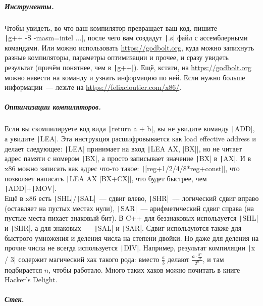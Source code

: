 \documentclass{article}
\begin{document}
    \subparagraph{Инструменты.}
    Чтобы увидеть, во что ваш компилятор превращает ваш код, пишите\\
    \texttt|g++ -S -masm=intel ...|, после чего вам создадут \texttt|.s| файл с ассемблерными командами. Или можно использовать \url{https://godbolt.org}, куда можно запихнуть разные компиляторы, параметры оптимизации и прочее, и сразу увидеть результат (причём понятнее, чем в \texttt|g++|). Ещё, кстати, на \url{https://godbolt.org} можно навести на команду и узнать информацию по ней. Если нужно больше информации~--- лезьте на \url{https://felixcloutier.com/x86/}.
    \subparagraph{Оптимизации компиляторов.}
    Если вы скомпилируете код вида \texttt|return a + b|, вы не увидите команду \texttt|ADD|, а увидите \texttt|LEA|. Эта инструкция расшифровывается как load effective address и делает следующее: \texttt|LEA| принимает на вход \texttt|LEA AX, [BX]|, но не читает адрес памяти с номером \texttt|BX|, а просто записывает значение \texttt|BX| в \texttt|AX|. И в x86 можно записать как адрес что-то такое: \texttt|[reg+1/2/4/8*reg+const]|, что позволяет написать \texttt|LEA AX [BX+CX]|, что будет быстрее, чем \texttt|ADD|+\texttt|MOV|.\\
    Ещё в x86 есть \texttt|SHL|/\texttt|SAL|~--- сдвиг влево, \texttt|SHR|~--- логический сдвиг вправо (оставляет на пустых местах нули), \texttt|SAR|~--- арифметический сдвиг справа (на пустые места пихает знаковый бит). В C++ для беззнаковых используется \texttt|SHL| и \texttt|SHR|, а для знаковых~--- \texttt|SAL| и \texttt|SAR|. Сдвиг используются также для быстрого умножения  и деления числа на степени двойки. Но даже для деления на прочие числа не всегда используется \texttt|DIV|. Например, результат компиляции \texttt|x / 3| содержит магический хак такого рода: вместо $\frac a3$ делают $\frac{a\cdot\frac{2^n}3}{2^n}$, и там подбирается $n$, чтобы работало. Много таких хаков можно почитать в книге Hacker's Delight.
    \subparagraph{Стек.}
\end{document}
